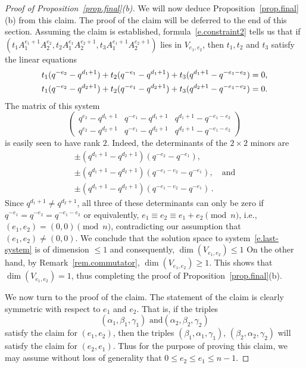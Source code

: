 \documentclass[12pt]{amsart}
\numberwithin{equation}{section}
\numberwithin{subsection}{section}
\theoremstyle{definition} \newtheorem{definition}[theorem]{Definition}
\begin{document}
\begin{proof}[Proof of Proposition~\ref{prop.final}(b)]
\smallskip
We will now deduce Proposition~\ref{prop.final}(b) from this claim.
The proof of the claim will be deferred to the end of this section.
Assuming the claim is established, formula~\eqref{e.constraint2} tells us that
if $(t_1 A_1^{e_1+1} A_2^{e_2}, t_2 A_1^{e_1} A_2^{e_2 + 1}, t_3 A_1^{e_1 + 1}
A_2^{e_2 + 1})$ lies in $V_{e_1, e_2}$, then 
$t_1, t_2$ and $t_3$ satisfy the linear equations
\begin{gather}
\nonumber
\text{$ t_1 (q^{-e_2} - q^{d_1+1}) + t_2 (q^{-e_1} - q^{d_1+1}) 
+ t_3 (q^{d_1+1} - q^{-e_1 - e_2}) = 0$,} \\
\label{e.last-system}
\text{$ t_1 (q^{-e_2} - q^{d_2+1}) + t_2 (q^{-e_1} - q^{d_2+1}) 
+ t_3 (q^{d_2+1} - q^{-e_1 - e_2}) = 0$.} 
\end{gather}
The matrix of this system
\[ \begin{pmatrix}
q^{e_2} - q^{d_1+1} & q^{-e_1} - q^{d_1+1} & q^{d_1+1} - q^{-e_1 - e_2} \\
q^{e_2} - q^{d_2+1} & q^{-e_1} - q^{d_2+1} & q^{d_2+1} - q^{-e_1 - e_2} 
\end{pmatrix} \]
is easily seen to have rank $2$. Indeed, the determinants of the
$2 \times 2$ minors are 
\begin{gather} 
\nonumber
\pm (q^{d_1+1} - q^{d_2+1})(q^{-e_2} - q^{-e_1}), \\
\nonumber
\pm (q^{d_1+1} - q^{d_2+1})(q^{-e_1-e_2} - q^{-e_1}), \quad \text{and}\\
\nonumber
\pm (q^{d_1+1} - q^{d_2+1})(q^{-e_1 - e_2} - q^{-e_1}) \, .  
\end{gather}
Since $q^{d_1 +1} \neq q^{d_2 + 1}$, 
all three of these determinants can only be zero if 
$q^{-e_1} = q^{-e_2} = q^{-e_1 - e_2}$ or equivalently, 
$e_1 \equiv e _2 \equiv e_1 + e_2
\pmod{n}$, i.e., $(e_1, e_2) = (0, 0) \pmod{n}$,
contradicting our assumption that $(e_1, e_2) \neq (0, 0)$. 
We conclude that the solution space to
system~\eqref{e.last-system} is of dimension $ \leqslant 1$
and consequently, $\dim(V_{e_1, e_2}) \leqslant 1$
On the other hand, by Remark~\ref{rem.commutator}, 
$\dim(V_{e_1, e_2}) \geqslant 1$.
This shows that $\dim(V_{e_1, e_2}) = 1$, 
thus completing the proof of Proposition~\ref{prop.final}(b).

We now turn to the proof of the claim. The statement of the claim 
is clearly symmetric with respect to $e_1$ and $e_2$. That is, 
if the triples \[ \text{$(\alpha_1, \beta_1, \gamma_1)$ and
$(\alpha_2, \beta_2, \gamma_2)$} \] satisfy the claim 
for $(e_1, e_2)$, then the triples $(\beta_1, \alpha_1, \gamma_1)$,
$(\beta_2, \alpha_2, \gamma_2)$ will satisfy the claim for
$(e_2, e_1)$. Thus for the purpose of proving this claim, we may 
assume without loss of generality that 
$0 \leqslant e_2 \leqslant e_1 \leqslant n-1$.


\end{proof}
\end{document}

